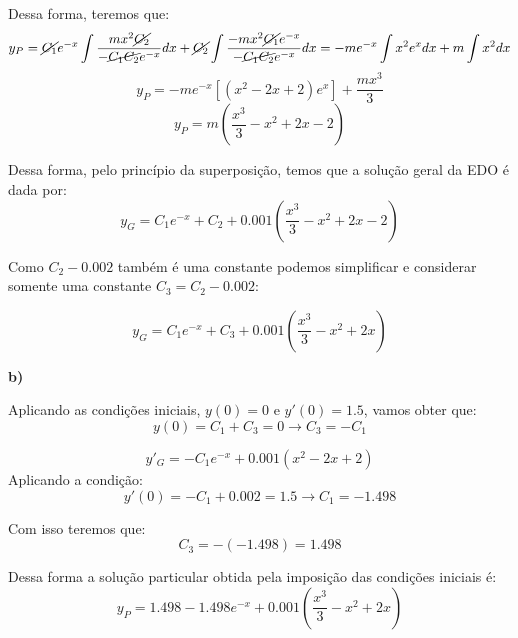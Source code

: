 Dessa forma, teremos que:
\begin{equation*}
    y_P = \cancel{C_1}e^{-x}\int \frac{mx^2\cancel{C_2}}{-\cancel{C_1C_2}e^{-x}} dx + \cancel{C_2}\int \frac{-mx^2\cancel{C_1}e^{-x}}{-\cancel{C_1C_2}e^{-x}} dx = -me^{-x} \int x^2e^{x} dx + m\int x^2 dx
\end{equation*}
\begin{equation*}
    y_P = -me^{-x}[(x^2-2x + 2)e^x] + \frac{mx^3}{3}
\end{equation*}
\begin{equation*}
    y_P = m\left(\frac{x^3}{3} -x^2 + 2x - 2\right) 
\end{equation*}

Dessa forma, pelo princípio da superposição, temos que a solução geral da EDO é dada por:
\begin{equation*}
    y_G = C_1e^{-x} + C_2 + 0.001\left(\frac{x^3}{3} -x^2 + 2x - 2\right)
\end{equation*}

Como $C_2 - 0.002$ também é uma constante podemos simplificar e considerar somente uma constante $C_3 = C_2 - 0.002$:

\begin{equation*}
    \boxed{y_G = C_1e^{-x} + C_3 + 0.001\left(\frac{x^3}{3} -x^2 + 2x\right)}
\end{equation*}

\textbf{b)}

Aplicando as condições iniciais, $y(0) = 0$ e $y'(0) = 1.5$, vamos obter que:
\begin{equation*}
    y(0) = C_1 + C_3 = 0 \longrightarrow C_3 = -C_1
\end{equation*}

\begin{equation*}
    y'_G = -C_1e^{-x} + 0.001\left(x^2 - 2x + 2\right)
\end{equation*}
Aplicando a condição:
\begin{equation*}
    y'(0) = -C_1 + 0.002 = 1.5 \longrightarrow C_1 = -1.498 
\end{equation*}

Com isso teremos que:
\begin{equation*}
    C_3 = -(-1.498) = 1.498
\end{equation*}

Dessa forma a solução particular obtida pela imposição das condições iniciais é:
\begin{equation*}
    \boxed{y_P = 1.498 - 1.498e^{-x} +  0.001\left(\frac{x^3}{3} -x^2 + 2x\right)}
\end{equation*}

